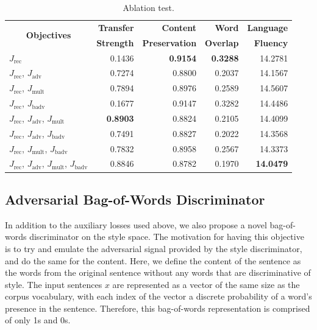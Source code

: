 \documentclass[11pt,a4paper]{article}
\newcommand{\tabc}[2]{\multicolumn{1}{|c|}{\multirow{#1}{*}{\textbf{#2}}}}
\newcommand{\loss}[1]{J_\text{#1}}
\begin{document}
\begin{table}[ht]
	\centering
	\begin{tabular}{| l | r | r | r | r |}
		\hline
		\tabc{2}{Objectives}                                     & \textbf{Transfer} & \textbf{Content}      & \textbf{Word}    & \textbf{Language} \\
		                                                         & \textbf{Strength} & \textbf{Preservation} & \textbf{Overlap} & \textbf{Fluency}  \\
		\hline
		\hline
		$\loss{rec}$                                             & 0.1436            & \textbf{0.9154}       & \textbf{0.3288}  & 14.2781           \\
		\hline
		$\loss{rec}$, $\loss{adv}$                               & 0.7274            & 0.8800                & 0.2037           & 14.1567           \\
		\hline
		$\loss{rec}$, $\loss{mult}$                              & 0.7894            & 0.8976                & 0.2589           & 14.5607           \\
		\hline
		$\loss{rec}$, $\loss{badv}$                              & 0.1677            & 0.9147                & 0.3282           & 14.4486           \\
		\hline
		$\loss{rec}$, $\loss{adv}$, $\loss{mult}$                & \textbf{0.8903}   & 0.8824                & 0.2105           & 14.4099           \\
		\hline
		$\loss{rec}$, $\loss{adv}$, $\loss{badv}$                & 0.7491            & 0.8827                & 0.2022           & 14.3568           \\
		\hline
		$\loss{rec}$, $\loss{mult}$, $\loss{badv}$               & 0.7832            & 0.8958                & 0.2567           & 14.3373           \\
		\hline
		$\loss{rec}$, $\loss{adv}$, $\loss{mult}$, $\loss{badv}$ & 0.8846            & 0.8782                & 0.1970           & \textbf{14.0479}  \\
		\hline
	\end{tabular}
	\caption{Ablation test.}
	\label{tab:ablation-results}
\end{table}

\subsection{Adversarial Bag-of-Words Discriminator} \label{sec:adversarial-bow-objective}

In addition to the auxiliary losses used above, we also propose a novel bag-of-words discriminator on the style space. The motivation for having this objective is to try and emulate the adversarial signal provided by the style discriminator, and do the same for the content. Here, we define the content of the sentence as the words from the original sentence without any words that are discriminative of style. The input sentences $x$ are represented as a vector of the same size as the corpus vocabulary, with each index of the vector a discrete probability of a word's presence in the sentence. Therefore, this bag-of-words representation is comprised of only 1s and 0s.
\end{document}
